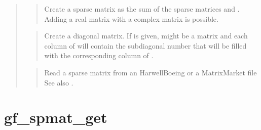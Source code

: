 \documentclass[a4paper,11pt,english]{sphinxmanual}
\begin{document}
\begin{quote}
\sphinxAtStartPar
{}
\begin{quote}

\sphinxAtStartPar
Create a sparse matrix as the sum of the sparse matrices  and .
Adding a real matrix with a complex matrix is possible.
\end{quote}

\sphinxAtStartPar
{}
\begin{quote}

\sphinxAtStartPar
Create a diagonal matrix. If  is given,  might be a matrix and
each column of  will contain the sub\sphinxhyphen{}diagonal number that will be
filled with the corresponding column of .
\end{quote}

\sphinxAtStartPar
{}
\begin{quote}

\sphinxAtStartPar
Read a sparse matrix from an Harwell\sphinxhyphen{}Boeing or a Matrix\sphinxhyphen{}Market file
See also .
\end{quote}
\end{quote}


\section{gf\_spmat\_get}
\label{\detokenize{matlab_octave/cmdref_gf_spmat_get:gf-spmat-get}}\label{\detokenize{matlab_octave/cmdref_gf_spmat_get::doc}}
\sphinxAtStartPar
{}
\end{document}
